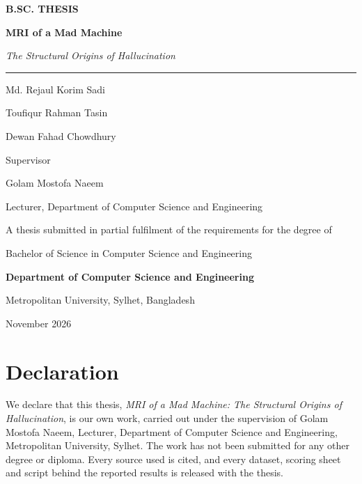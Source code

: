 \documentclass[11pt,a4paper,oneside]{report}
\begin{document}
\begin{titlepage}
\centering
\vspace*{1.2cm}
{\sffamily\small\color{accent}\textbf{B.SC. THESIS}\par}
\vspace{1.4cm}
{\fontsize{30}{36}\selectfont\bfseries\color{ink} MRI of a Mad Machine\par}
\vspace{0.4cm}
{\Large\itshape\color{muted} The Structural Origins of Hallucination\par}
\vspace{1.4cm}
{\color{accent}\rule{0.25\linewidth}{1.2pt}\par}
\vspace{1.2cm}
{\large Md. Rejaul Korim Sadi \par}
\vspace{0.15cm}
{\large Toufiqur Rahman Tasin \par}
\vspace{0.15cm}
{\large Dewan Fahad Chowdhury \par}
\vspace{1.6cm}
{\normalsize Supervisor\par}
{\large Golam Mostofa Naeem\par}
{\normalsize\color{muted} Lecturer, Department of Computer Science and Engineering\par}
\vfill
{\normalsize A thesis submitted in partial fulfilment of the requirements for the degree of\par Bachelor of Science in Computer Science and Engineering\par}
\vspace{0.8cm}
{\large\bfseries Department of Computer Science and Engineering\par}
{\large Metropolitan University, Sylhet, Bangladesh\par}
\vspace{0.4cm}
{\normalsize November 2026\par}
\end{titlepage}

\chapter*{Declaration}
We declare that this thesis, \emph{MRI of a Mad Machine: The Structural Origins of Hallucination}, is our own work, carried out under the supervision of Golam Mostofa Naeem, Lecturer, Department of Computer Science and Engineering, Metropolitan University, Sylhet. The work has not been submitted for any other degree or diploma. Every source used is cited, and every dataset, scoring sheet and script behind the reported results is released with the thesis.
\end{document}
